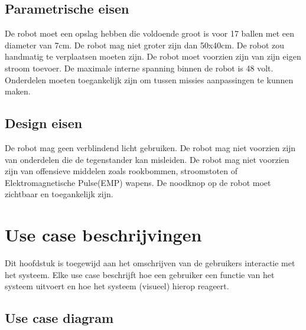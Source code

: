 \documentclass[12pt]{article} %
\begin{document}
\subsection{Parametrische eisen}
\begin{enumerate}
 De robot moet een opslag hebben die voldoende groot is voor 17 ballen met een diameter van 7cm.
 De robot mag niet groter zijn dan 50x40cm.
 De robot zou handmatig te verplaatsen moeten zijn. 
 De robot moet voorzien zijn van zijn eigen stroom toevoer.
 De maximale interne spanning binnen de robot is 48 volt.
 Onderdelen moeten toegankelijk zijn om tussen missies aanpassingen te kunnen maken.

\end{enumerate}
\newpage

\subsection{Design eisen}
\begin{enumerate}
 De robot mag geen verblindend licht gebruiken.
 De robot mag niet voorzien zijn van onderdelen die de tegenstander kan misleiden.
 De robot mag niet voorzien zijn van offensieve middelen zoals rookbommen, stroomstoten of Elektromagnetische Pulse(EMP) wapens.
 De noodknop op de robot moet zichtbaar en toegankelijk zijn.
\end{enumerate}
\newpage

\section{Use case beschrijvingen}
Dit hoofdstuk is toegewijd aan het omschrijven van de gebruikers interactie met het systeem. Elke use case beschrijft hoe een gebruiker een functie van het systeem uitvoert en hoe het systeem (visueel) hierop reageert.

\subsection{Use case diagram}
\end{document}
